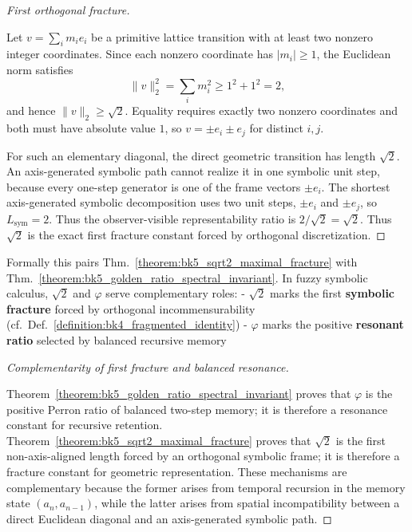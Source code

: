\begin{proof}[First orthogonal fracture]
\label{proof:bk5_sqrt2_maximal_fracture}
\leavevmode

Let $v=\sum_i m_i e_i$ be a primitive lattice transition with at least two
nonzero integer coordinates.  Since each nonzero coordinate has
$|m_i|\geq 1$, the Euclidean norm satisfies
\[
\|v\|_2^2=\sum_i m_i^2\geq 1^2+1^2=2,
\]
and hence $\|v\|_2\geq\sqrt{2}$.  Equality requires exactly two nonzero
coordinates and both must have absolute value $1$, so
$v=\pm e_i\pm e_j$ for distinct $i,j$.

For such an elementary diagonal, the direct geometric transition has length
$\sqrt{2}$.  An axis-generated symbolic path cannot realize it in one symbolic
unit step, because every one-step generator is one of the frame vectors
$\pm e_i$.  The shortest axis-generated symbolic decomposition uses two unit
steps, $\pm e_i$ and $\pm e_j$, so $L_{\mathrm{sym}}=2$.  Thus the
observer-visible representability ratio is $2/\sqrt{2}=\sqrt{2}$.
Thus $\sqrt{2}$ is the exact first fracture constant forced by orthogonal
discretization.
\end{proof}

\begin{proposition}
\label{proposition:bk5_complementary_constants}
Formally this pairs Thm.~\ref{theorem:bk5_sqrt2_maximal_fracture} with Thm.~\ref{theorem:bk5_golden_ratio_spectral_invariant}.
In fuzzy symbolic calculus, $\sqrt{2}$ and $\varphi$ serve complementary roles:
- $\sqrt{2}$ marks the first \textbf{symbolic fracture} forced by orthogonal incommensurability (cf.~Def.~\ref{definition:bk4_fragmented_identity})
- $\varphi$ marks the positive \textbf{resonant ratio} selected by balanced recursive memory
\end{proposition}

\begin{proof}[Complementarity of first fracture and balanced resonance]
\label{proof:bk5_complementary_constants}

\leavevmode

Theorem~\ref{theorem:bk5_golden_ratio_spectral_invariant} proves that
$\varphi$ is the positive Perron ratio of balanced two-step memory; it is
therefore a resonance constant for recursive retention.  Theorem~\ref{theorem:bk5_sqrt2_maximal_fracture}
proves that $\sqrt{2}$ is the first non-axis-aligned length forced by an
orthogonal symbolic frame; it is therefore a fracture constant for geometric
representation.  These mechanisms are complementary because the former arises
from temporal recursion in the memory state $(a_n,a_{n-1})$, while the latter
arises from spatial incompatibility between a direct Euclidean diagonal and an
axis-generated symbolic path.
\end{proof}

